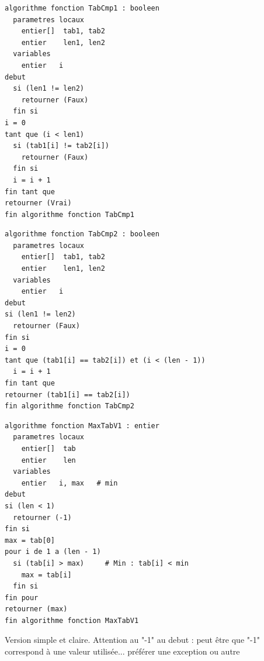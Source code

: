 \documentclass[11pt,a4paper]{article}
\begin{document}
\bigskip



\begin{table}[ht!]
  \centering
\begin{lstlisting}[style=algorithmique]
algorithme fonction TabCmp1 : booleen
  parametres locaux
    entier[]  tab1, tab2
    entier    len1, len2
  variables
    entier   i
debut
  si (len1 != len2)
    retourner (Faux)
  fin si
i = 0
tant que (i < len1)
  si (tab1[i] != tab2[i])
    retourner (Faux)
  fin si
  i = i + 1
fin tant que
retourner (Vrai)
fin algorithme fonction TabCmp1 \end{lstlisting}
\end{table}


\begin{table}[ht!]
  \centering
\begin{lstlisting}[style=algorithmique]
algorithme fonction TabCmp2 : booleen
  parametres locaux
    entier[]  tab1, tab2
    entier    len1, len2
  variables
    entier   i
debut
si (len1 != len2)
  retourner (Faux)
fin si
i = 0
tant que (tab1[i] == tab2[i]) et (i < (len - 1))
  i = i + 1
fin tant que
retourner (tab1[i] == tab2[i])
fin algorithme fonction TabCmp2 \end{lstlisting}
\end{table}


\bigskip



\begin{table}[ht!]
  \centering
\begin{lstlisting}[style=algorithmique]
algorithme fonction MaxTabV1 : entier
  parametres locaux
    entier[]  tab
    entier    len
  variables
    entier   i, max   # min
debut
si (len < 1)
  retourner (-1)
fin si
max = tab[0]
pour i de 1 a (len - 1)
  si (tab[i] > max)     # Min : tab[i] < min
    max = tab[i]
  fin si
fin pour
retourner (max)
fin algorithme fonction MaxTabV1 \end{lstlisting}
  \caption{Version simple et claire. Attention au "-1" au debut : peut être que "-1" correspond à une valeur utilisée... préférer une exception ou autre}
\end{table}
\end{document}
